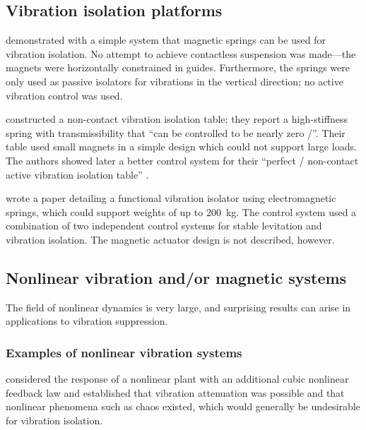 \documentclass[11pt,a4paper]{memoir}
\begin{document}
\subsection{Vibration isolation platforms}

\textcite{puppin2002} demonstrated with a simple system that magnetic springs can be used for vibration isolation. No attempt to achieve contactless suspension was made—the magnets were horizontally constrained in guides.
Furthermore, the springs were only used as passive isolators for vibrations in the vertical direction; no active vibration control was used.

\textcite{nagaya1993} constructed a non-contact vibration isolation table; they report a high-stiffness spring with transmissibility that \enquote{can be controlled to be nearly zero \sic/}.
Their table used small magnets in a simple design which could not support large loads.
The authors showed later a better control system for their \enquote{perfect \sic/
non-contact active vibration isolation table} \cite{nagaya1995a}.

\textcite{watanabe1996} wrote a paper detailing a functional vibration isolator using electromagnetic springs, which could support weights of up to
\SI{200}{kg}.
The control system used a combination of two independent control systems for stable levitation and vibration isolation.
The magnetic actuator design is not described, however.



\subsection{Nonlinear vibration and/or magnetic systems}

The field of nonlinear dynamics is very large, and surprising results can arise in applications to vibration suppression.

\subsubsection{Examples of nonlinear vibration systems}

\textcite{oueini1999} considered the response of a nonlinear plant with an additional cubic nonlinear feedback law and established that vibration attenuation was possible and that nonlinear phenomena such as chaos existed, which would generally be undesirable for vibration isolation.
\end{document}
